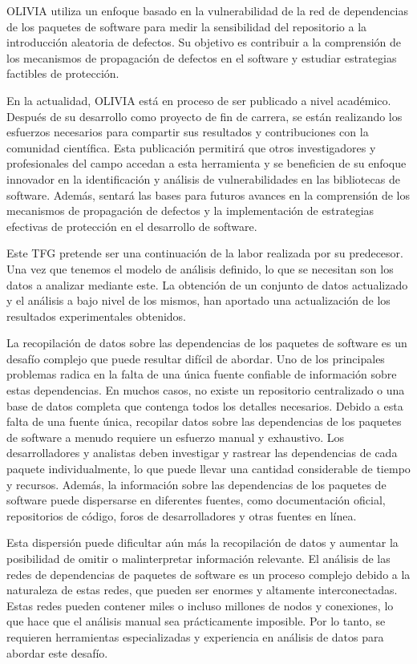 OLIVIA utiliza un enfoque basado en la vulnerabilidad de la red de dependencias de los paquetes de software para medir la sensibilidad del repositorio a la introducción aleatoria de defectos. Su objetivo es contribuir a la comprensión de los mecanismos de propagación de defectos en el software y estudiar estrategias factibles de protección.


En la actualidad, OLIVIA está en proceso de ser publicado a nivel académico.
Después de su desarrollo como proyecto de fin de carrera, se están realizando los esfuerzos necesarios para compartir sus resultados y
contribuciones con la comunidad científica.
Esta publicación permitirá que otros investigadores y profesionales del campo accedan a esta herramienta y se beneficien de su enfoque
innovador en la identificación y análisis de vulnerabilidades en las bibliotecas de software. Además, sentará las bases para futuros avances
en la comprensión de los mecanismos de propagación de defectos y la implementación de estrategias efectivas de protección en el desarrollo de software.


Este TFG pretende ser una continuación de la labor realizada por su predecesor.
Una vez que tenemos el modelo de análisis definido, lo que se necesitan son los datos a analizar mediante este.
La obtención de un conjunto de datos actualizado y el análisis a bajo nivel de los mismos, han aportado una actualización de los resultados experimentales obtenidos.

La recopilación de datos sobre las dependencias de los paquetes de software es un desafío complejo que puede resultar difícil de abordar.
Uno de los principales problemas radica en la falta de una única fuente confiable de información sobre estas dependencias.
En muchos casos, no existe un repositorio centralizado o una base de datos completa que contenga todos los detalles necesarios.
Debido a esta falta de una fuente única, recopilar datos sobre las dependencias de los paquetes de software a menudo requiere un esfuerzo manual y exhaustivo.
Los desarrolladores y analistas deben investigar y rastrear las dependencias de cada paquete individualmente, lo que puede llevar una cantidad considerable de tiempo y recursos.
Además, la información sobre las dependencias de los paquetes de software puede dispersarse en diferentes fuentes, como documentación oficial,
repositorios de código, foros de desarrolladores y otras fuentes en línea.


Esta dispersión puede dificultar aún más la recopilación de datos y aumentar la posibilidad de omitir o malinterpretar información relevante.
El análisis de las redes de dependencias de paquetes de software es un proceso complejo debido a la naturaleza de estas redes, que pueden ser enormes y altamente interconectadas. Estas redes pueden contener miles o incluso millones de nodos y conexiones, lo que hace que el análisis manual sea prácticamente imposible. Por lo tanto, se requieren herramientas especializadas y experiencia en análisis de datos para abordar este desafío.



